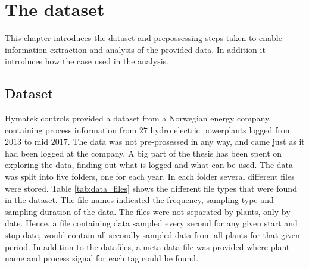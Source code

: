 \chapter{The dataset}\label{cha:data}

This chapter introduces the dataset and prepossessing steps taken to enable information extraction and analysis of the provided data. In addition it introduces how the case used in the analysis. 








\section{Dataset}\label{sec:dataset}
    Hymatek controls provided a dataset from a Norwegian energy company, containing process information from $27$ hydro electric powerplants logged from $2013$ to mid $2017$. The data was not pre-prosessed in any way, and came just as it had been logged at the company. A big part of the thesis has been spent on exploring the data, finding out what is logged and what can be used. The data was split into five folders, one for each year. In each folder several different files were stored. Table \ref{tab:data_files} shows the different file types that were found in the dataset. The file names indicated the frequency, sampling type and sampling duration of the data. The files were not separated by plants, only by date. Hence, a file containing data sampled every second for any given start and stop date, would contain all secondly sampled data from all plants for that given period. In addition to the datafiles, a meta-data file was provided where plant name and process signal for each tag could be found. \cite{}
    
